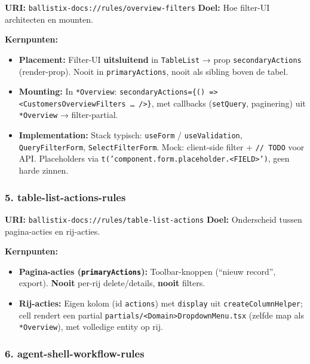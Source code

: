 \noindent
\textbf{URI:} \texttt{ballistix-docs://rules/overview-filters} \newline
\textbf{Doel:} Hoe filter-UI architecten en mounten.

\noindent
\textbf{Kernpunten:}

\begin{itemize}
  \item \textbf{Placement:} Filter-UI \textbf{uitsluitend} in \texttt{TableList} → prop \texttt{secondaryActions} (render-prop). Nooit in \texttt{primaryActions}, nooit als sibling boven de tabel.
  \item \textbf{Mounting:} In \texttt{*Overview}: \texttt{secondaryActions=\{() => <CustomersOverviewFilters … />\}}, met callbacks (\texttt{setQuery}, paginering) uit \texttt{*Overview} → filter-partial.
  \item \textbf{Implementation:} Stack typisch: \texttt{useForm} / \texttt{useValidation}, \texttt{QueryFilterForm}, \texttt{SelectFilterForm}. Mock: client-side filter + \texttt{// TODO} voor API. Placeholders via \texttt{t('component.form.placeholder.<FIELD>')}, geen harde zinnen.
\end{itemize}

\subsubsection{5. table-list-actions-rules}

\noindent
\textbf{URI:} \texttt{ballistix-docs://rules/table-list-actions} \newline
\textbf{Doel:} Onderscheid tussen pagina-acties en rij-acties.

\noindent
\textbf{Kernpunten:}

\begin{itemize}
  \item \textbf{Pagina-acties (\texttt{primaryActions}):} Toolbar-knoppen (``nieuw record'', export). \textbf{Nooit} per-rij delete/details, \textbf{nooit} filters.
  \item \textbf{Rij-acties:} Eigen kolom (id \texttt{actions}) met \texttt{display} uit \texttt{createColumnHelper}; cell rendert een partial \texttt{partials/<Domain>DropdownMenu.tsx} (zelfde map als \texttt{*Overview}), met volledige entity op rij.
\end{itemize}

\subsubsection{6. agent-shell-workflow-rules}

